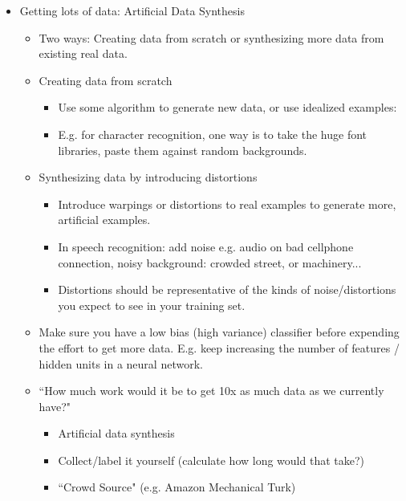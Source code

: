 \documentclass[letterpaper,10pt]{article}
\begin{document}
\begin{itemize}
\item Getting lots of data: Artificial Data Synthesis
	\begin{itemize}
	\item Two ways: Creating data from scratch or synthesizing more data from existing real data.
	\item Creating data from scratch
		\begin{itemize}
		\item Use some algorithm to generate new data, or use idealized examples:
		\item E.g. for character recognition, one way is to take the huge font libraries, paste them against random backgrounds.
		\end{itemize}
	\item Synthesizing data by introducing distortions
		\begin{itemize}
		\item Introduce warpings or distortions to real examples to generate more, artificial examples.
		\item In speech recognition: add noise e.g. audio on bad cellphone connection, noisy background: crowded street, or machinery...
		\item Distortions should be representative of the kinds of noise/distortions you expect to see in your training set.
		\end{itemize}
	\item Make sure you have a low bias (high variance) classifier before expending the effort to get more data. E.g. keep increasing the number of features / hidden units in a neural network.
	\item ``How much work would it be to get 10x as much data as we currently have?"
		\begin{itemize}
		\item Artificial data synthesis
		\item Collect/label it yourself (calculate how long would that take?)
		\item ``Crowd Source" (e.g. Amazon Mechanical Turk)
		\end{itemize}
	\end{itemize}


\end{itemize}
\end{document}
